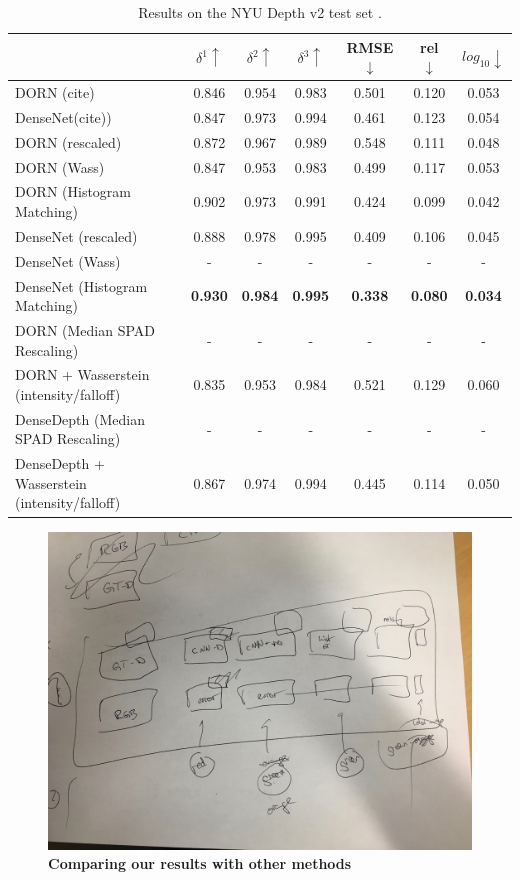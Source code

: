 \begin{table}
\begin{center}
\begin{tabular}{lccc|ccc}
  \toprule
    & $\delta^1 \uparrow$ & $\delta^2\uparrow$ & $\delta^3 \uparrow$ & RMSE $\downarrow$ & rel $\downarrow$ & $log_{10} \downarrow$ \\
  \midrule
  DORN (cite)&0.846&0.954&0.983&0.501&0.120&0.053 \\
DenseNet(cite))&0.847&0.973&0.994&0.461&0.123&0.054 \\
  \midrule
  DORN (rescaled) & 0.872 & 0.967 & 0.989 & 0.548 & 0.111 & 0.048 \\
  DORN (Wass) & 0.847 & 0.953 & 0.983 & 0.499 & 0.117 & 0.053 \\
  DORN (Histogram Matching) & 0.902 & 0.973 & 0.991 & 0.424 & 0.099 & 0.042 \\
  DenseNet (rescaled) &0.888 & 0.978&0.995&0.409&0.106&0.045 \\
  DenseNet (Wass) & - & - & - & - & - & - \\ 
  DenseNet (Histogram Matching) &\textbf{0.930} &\textbf{0.984}&\textbf{0.995}&\textbf{0.338}&\textbf{0.080}&\textbf{0.034}\\
  \midrule
  DORN (Median SPAD Rescaling) & - & - & - & - & - & - \\
  DORN + Wasserstein (intensity/falloff) & 0.835 & 0.953 & 0.984 & 0.521 & 0.129 & 0.060 \\
  DenseDepth (Median SPAD Rescaling) & - & - & - & - & - & - \\
  DenseDepth + Wasserstein (intensity/falloff) & 0.867 & 0.974 & 0.994 & 0.445 & 0.114 & 0.050 \\
  \midrule
  \bottomrule
\end{tabular} 
\end{center}
\caption{Results on the NYU Depth v2 test set \cite{nyudepth}.}
\end{table}

\begin{figure}
  \includegraphics[width=\textwidth/2]{sections/figures/comparison.jpeg}
  \caption{\textbf{Comparing our results with other methods}}
\end{figure}

  


